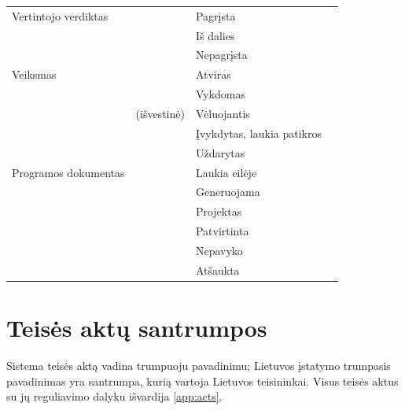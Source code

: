 \begin{xltabular}{\textwidth}{@{}L{26mm}L{26mm}L{40mm}Y@{}}
\midrule
Vertintojo verdiktas &  & Pagrįsta &  \\
 &  & Iš dalies &  \\
 &  & Nepagrįsta &  \\
\midrule
Veiksmas &  & Atviras &  \\
 &  & Vykdomas &  \\
 & (išvestinė) & Vėluojantis &  \\
 &  & Įvykdytas, laukia patikros &  \\
 &  & Uždarytas &  \\
\midrule
Programos dokumentas &  & Laukia eilėje &  \\
 &  & Generuojama &  \\
 &  & Projektas &  \\
 &  & Patvirtinta &  \\
 &  & Nepavyko &  \\
 &  & Atšaukta &  \\
\end{xltabular}

\section{Teisės aktų santrumpos}\label{sec:glossary:acts}

Sistema teisės aktą vadina trumpuoju pavadinimu; Lietuvos įstatymo trumpasis pavadinimas yra
santrumpa, kurią vartoja Lietuvos teisininkai. Visus teisės aktus su jų reguliavimo dalyku
išvardija \cref{app:acts}.

